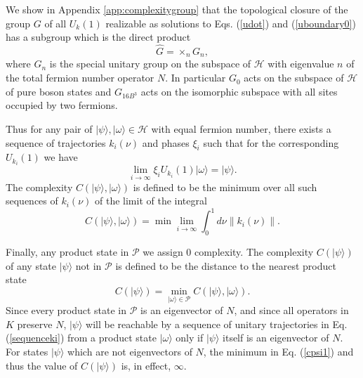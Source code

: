 \documentclass[twocolumn,amsmath,amssymb]{revtex4-1}
\begin{document}
We show in Appendix \ref{app:complexitygroup}
that the topological closure of the group $G$ of all $U_k( 1)$ realizable as solutions to Eqs. (\ref{udot}) and
(\ref{uboundary0}) has a subgroup which is the direct product
\begin{equation}
\label{formofg}
\hat{G} = \times_n G_n,
\end{equation}
where $G_n$ is the special unitary group on the subspace of $\mathcal{H}$
with eigenvalue $n$ of the total fermion number operator $N$.
In particular $G_0$ acts on the subspace of $\mathcal{H}$ of
pure boson states and $G_{16 B^3}$ acts on the
isomorphic subspace with all sites occupied by two fermions.



Thus for any pair of $|\psi \rangle , |\omega \rangle  \in \mathcal{H}$ with equal
fermion number, there 
exists a sequence of trajectories $k_i(\nu)$ and phases $\xi_i$ such that for the corresponding
$U_{k_i}(1)$ we have
\begin{equation}
\label{sequenceki}
\lim_{i \rightarrow \infty} \xi_i U_{k_i}(1) |\omega \rangle  = |\psi \rangle .
\end{equation}
The complexity $C(|\psi \rangle , |\omega \rangle )$ is defined to be the minimum 
over all such sequences of $k_i(\nu)$ of the
limit of the integral
\begin{equation}
\label{complexity}
C(| \psi \rangle , |\omega \rangle ) = \min \lim_{i \rightarrow \infty} \int_0^1 d \nu \parallel k_i( \nu) \parallel. 
\end{equation}

Finally, any product state in $\mathcal{P}$ we assign 0 complexity. 
The complexity $C( |\psi \rangle )$ of any state $|\psi \rangle $ not in $\mathcal{P}$
is defined to be the distance to the nearest product state
\begin{equation}
\label{cpsi1}
C( |\psi \rangle ) = \min_{|\omega \rangle  \in \mathcal{P}} C(| \psi \rangle , |\omega \rangle ).
\end{equation}
Since every product state in $\mathcal{P}$ is an eigenvector of $N$,
and since all operators in $K$ preserve $N$,  $|\psi \rangle $ will be reachable by
a sequence of unitary trajectories in Eq. (\ref{sequenceki}) from a product
state $|\omega \rangle $ only if $|\psi \rangle $ itself is an eigenvector of $N$.
For states $|\psi \rangle $ which are not eigenvectors of $N$, the minimum
in Eq. (\ref{cpsi1}) and thus the value of $C(|\psi \rangle )$ is, in effect, $\infty$.
\end{document}

